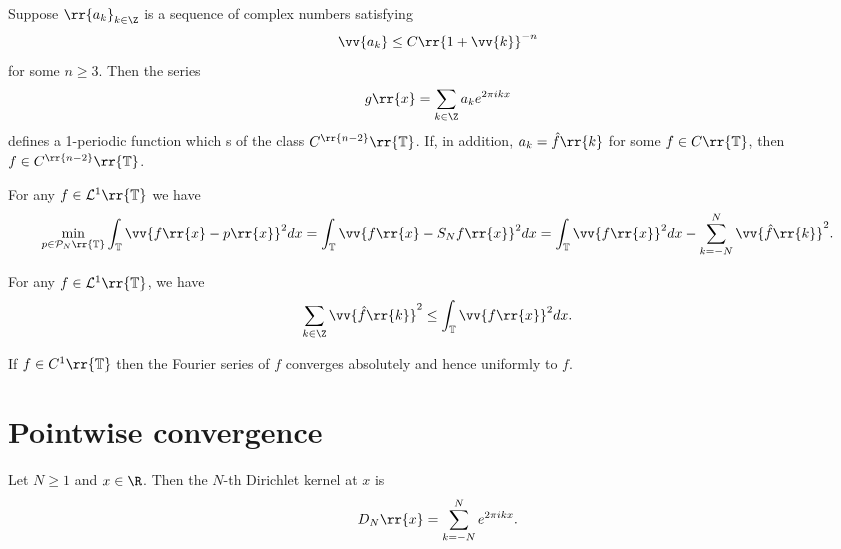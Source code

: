 \documentclass{article}
\begin{document}
\begin{proposition}
  Suppose $\rr{a_k}_{k\in\Z}$ is a sequence of complex numbers satisfying
  \begin{align*}
    \vv{a_k}\leq C\rr{1+\vv{k}}^{-n}
  \end{align*}
  for some $n\geq 3$. Then the series
  \begin{align*}
    g\rr{x}=\sum_{k\in\Z} a_k e^{2\pi ikx}
  \end{align*}
  defines a 1-periodic function which s of the class $C^{\rr{n-2}}\rr{\mathbb T}$. If,
  in addition, $a_k=\hat f\rr{k}$ for some $f\in C\rr{\mathbb T}$, then
  $f\in C^{\rr{n-2}}\rr{\mathbb T}$.
\end{proposition}

\begin{proposition}
  For any $f\in\mathcal L^1\rr{\mathbb T}$ we have
  \begin{align*}
    \min_{p\in\mathcal P_N\rr{\mathbb T}} \int_{\mathbb T}\vv{f\rr{x}-p\rr{x}}^2 dx
    = \int_{\mathbb T}\vv{f\rr{x}-S_Nf\rr{x}}^2dx
    = \int_{\mathbb T}\vv{f\rr{x}}^2dx - \sum_{k=-N}^{ N } \vv{\hat f\rr{k}}^2.
  \end{align*}
\end{proposition}

\begin{corollary}[Bessel]
  For any $f\in\mathcal L^1\rr{\mathbb T}$, we have
  \begin{align*}
    \sum_{k\in\Z}\vv{\hat f\rr{k}}^2 \leq \int_{\mathbb T}\vv{f\rr{x}}^2dx.
  \end{align*}
\end{corollary}

\begin{proposition}
  If $f\in C^1\rr{\mathbb T}$ then the Fourier series of $f$ converges absolutely and hence
  uniformly to $f$.
\end{proposition}

\section{Pointwise convergence}\label{sec:pointwise_convergence}

\begin{definition}
  Let $N\geq 1$ and $x\in\R$. Then the $N$-th Dirichlet kernel at $x$ is
  \begin{align*}
    D_N\rr{x}=\sum_{k=-N}^N e^{2\pi ikx}.
  \end{align*}
\end{definition}
\end{document}
